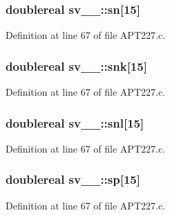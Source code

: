 \subsubsection[{\texorpdfstring{sn}{sn}}]{\setlength{\rightskip}{0pt plus 5cm}doublereal sv\+\_\+\_\+\+::sn\mbox{[}15\mbox{]}}\hypertarget{structsv__1___a77643210819415e0a221f506fe64bc02}{}\label{structsv__1___a77643210819415e0a221f506fe64bc02}


Definition at line 67 of file A\+P\+T227.\+c.

\subsubsection[{\texorpdfstring{snk}{snk}}]{\setlength{\rightskip}{0pt plus 5cm}doublereal sv\+\_\+\_\+\+::snk\mbox{[}15\mbox{]}}\hypertarget{structsv__1___ae2a293a126a238a26e63782f519f5fc5}{}\label{structsv__1___ae2a293a126a238a26e63782f519f5fc5}


Definition at line 67 of file A\+P\+T227.\+c.

\subsubsection[{\texorpdfstring{snl}{snl}}]{\setlength{\rightskip}{0pt plus 5cm}doublereal sv\+\_\+\_\+\+::snl\mbox{[}15\mbox{]}}\hypertarget{structsv__1___afceeb8cdf2635d59e3ef0be5a8788888}{}\label{structsv__1___afceeb8cdf2635d59e3ef0be5a8788888}


Definition at line 67 of file A\+P\+T227.\+c.

\subsubsection[{\texorpdfstring{sp}{sp}}]{\setlength{\rightskip}{0pt plus 5cm}doublereal sv\+\_\+\_\+\+::sp\mbox{[}15\mbox{]}}\hypertarget{structsv__1___a9b19f20fe16e6deabbc25a2e1271d01d}{}\label{structsv__1___a9b19f20fe16e6deabbc25a2e1271d01d}


Definition at line 67 of file A\+P\+T227.\+c.

